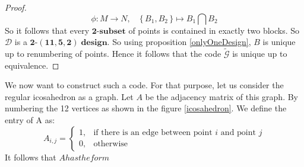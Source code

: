 \documentclass{article}
\numberwithin{equation}{theorem}
\numberwithin{figure}{theorem}
\newcommand{\tParamDesign}[4]{\ensuremath{\bm{#1\mbox{-}(#2,#3,#4)\; design}}}
\newcommand{\dDes}{\ensuremath{\mathscr{D}}}
\newcommand{\cCodes}{\ensuremath{\widetilde{\mathscr{G}}}}
\newcommand{\tSubset}[1]{\ensuremath{\bm{#1\mbox{-}{subset}}}}
\begin{document}
\begin{proof}
\[
	\phi: M \rightarrow N, \quad \{\,B_1,B_2\,\} \mapsto B_1 \bigcap B_2
\]
So it follows that every {\tSubset{2}} of points is contained in exactly two blocks. So {\dDes} is a {\tParamDesign{2}{11}{5}{2}}. So using proposition \ref{onlyOneDesign}, $B$ is unique up to renumbering of points. Hence it follows that the code {\cCodes} is unique up to equivalence.
\end{proof}

We now want to construct such a code. For that purpose, let us consider the regular icosahedron as a graph. Let $A$ be the adjacency matrix of this graph. By numbering the 12 vertices as shown in the figure \ref{icosahedron}. We define the entry of A as:
\[
	A_{i,j} = 
	\begin{cases}
		1, &\text{if there is an edge between point $i$ and point $j$}\\
		0, &\text{otherwise}
	\end{cases}
\]
It follows that $A has the form$
\end{document}
